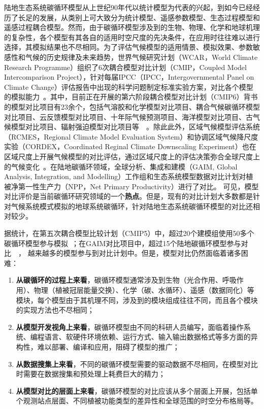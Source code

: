 陆地生态系统碳循环模型从上世纪90年代以统计模型为代表的兴起，到如今已经经历了长足的发展，从类别上可大致分为统计模型、遥感参数模型、生态过程模型和遥感过程耦合模型。然而，由于碳循环模型涉及到的生物、物理、化学和地球机理的复杂性，各个模型有其各自的适用时空尺度的先决条件，在应用时往往难以进行选择，其模拟结果也不尽相同。为了评估气候模型的适用情景、模拟效果、参数敏感性和气候的历史规律及未来趋势，世界气候研究计划（WCAR，World Climate Research Programme）组织了6次耦合模型对比计划（CMIP，Coupled Model Intercomparison Project），针对每届IPCC（IPCC，Intergovernmental Panel on Climate Change）评估报告中出现的科学问题制定标准实验方案，对比各个模型的模拟能力~\cite{meehl2000coupled}。其中，目前正在开展的第六阶段耦合模型对比计划（CMIP6）背书的模型对比项目有23余个，包括气溶胶和化学模型对比项目、耦合气候碳循环模型对比项目、云反馈模型对比项目、十年际气候预测项目、海洋模型对比项目、古气候模型对比项目、辐射强迫模型对比项目等~\cite{eyring2016overview}~\cite{WCRP-CMIP6-Endorsed-CMIPs}。除此此外，区域气候模型评估系统（RCMES，Regional Climate Model Evaluation System）和协调区域气候降尺度实验（CORDEX，Coordinated Reginal Climate Downscaling Experiment）也在区域尺度上开展气候模型的对比评估，通过区域尺度上的评估决策弥合全球尺度上的气候变化~\cite{loikith2013scientific}。在陆地碳循环领域，全球分析、集成和建模（GAIM, Global Analysis, Integration, and Modelling）工作组和生态系统模型数据对比计划对植被净第一性生产力（NPP，Net Primary Productivity）进行了对比。
可见，模型对比评价是当前碳循环研究领域的一个\textbf{热点}。但是，现有的对比计划大多数都是针对气候系统模式模拟的地球系统碳循环，针对陆地生态系统碳循环模型的对比还相对较少。

据统计，在第五次耦合模型比较计划（CMIP5）中，超过20个建模组使用50多个碳循环模型参与模拟~\cite{Taylor2012An}；在GAIM对比项目中，超过15个陆地碳循环模型参与对比~\cite{cramer1999comparing}~\cite{kicklighter1999comparing}，
越来越多的模型参与到对比计划中。但是，模型对比仍然面临着诸多困难：

\begin{enumerate}[(1)]
    \item \textbf{从碳循环的过程上来看}，碳循环模型通常涉及到生物（光合作用、呼吸作用）、物理（植被冠层能量交换）、化学（碳、水循环）、遥感（数据同化）等模块，每个模型由于其机理不同，涉及到的模块组成往往不同，而且各个模块的实现方法也不尽相同；
    \item \textbf{从模型开发视角上来看}，碳循环模型由不同的科研人员编写，面临着操作系统、编程语言、软硬件环境依赖、运行方式、输入输出数据格式等多方面的异构性，难以部署、编译和应用，阻碍了模型的推广；
    \item \textbf{从数据搜集上来看}，不同的碳循环模型需要的驱动数据不尽相同，在模型对比时需要在数据搜集和预处理上耗费巨大的精力；
    \item \textbf{从模型对比的层面上来看}，碳循环模型的对比应该从多个层面上开展，包括单个观测站点层面、不同植被功能类型的差异性和全球范围的时空分布格局等。
\end{enumerate}

